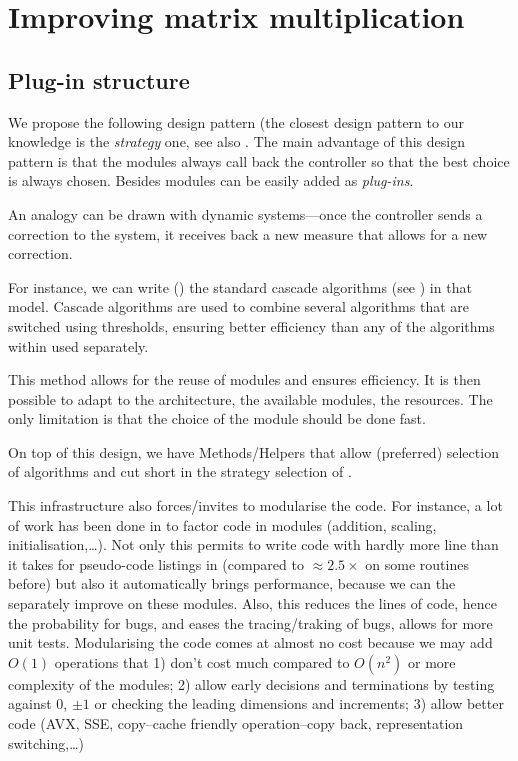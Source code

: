 \section{Improving \linbox matrix multiplication}\label{sec:matmul}
%
%
\subsection{Plug-in structure}
%
We propose the following design pattern (the closest design pattern to our
knowledge is the \emph{strategy} one, see also \cite[Fig 2.]{Cung:2006:TC}.
The main advantage of this design pattern is that the modules always call back
the controller so that the best choice is always chosen.  Besides modules can
be easily added as \emph{plug-ins}.
%

%
An analogy can be drawn with dynamic
systems---once the controller sends a correction to the system, it receives
back a new measure that allows for a new correction.
%
%
%
\par
%
For instance, we can write () the standard cascade algorithms
(see \cite{Dumas:Fflas}) in that model. Cascade algorithms are used to combine
several algorithms that are switched using thresholds, ensuring better
efficiency than any of the algorithms within used separately.
%
%

%
This method allows for the reuse of modules and ensures efficiency.
It is then possible to adapt to the architecture, the available modules,
the resources. The only limitation is that the choice of the module
should be done fast.
%
\par
%
On top of this design, we have Methods/Helpers that allow (preferred) selection
of algorithms and cut short in the strategy selection of .
%
%
%
\par
%
This infrastructure also forces/invites to modularise the code. For instance, a lot
of work has been done in \fflasffpack to factor code in modules (addition,
scaling, initialisation,\ldots). Not only this permits to write code with
hardly more line than it takes for pseudo-code listings in
\cite{Boyer:2009:sched} (compared to $\approx 2.5\times$ on some routines
before) but also it automatically brings performance, because we can the
separately improve on these modules. Also, this reduces the lines of code,
hence the probability for bugs, and eases the tracing/traking of bugs, allows
for more unit tests. Modularising the code comes at almost no cost because we
may add $O(1)$  operations that 1) don't cost much compared to $O(n^2)$ or more
complexity of the modules; 2) allow early decisions and terminations by testing
against $0$, $\pm 1$ or checking the leading dimensions and increments; 3)
allow better code (AVX, SSE, copy--cache friendly operation--copy back,
representation switching,\ldots)
%
